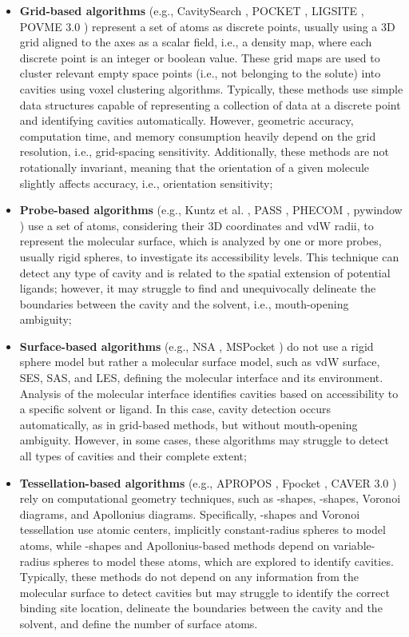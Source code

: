 \documentclass[Ingles]{phdthesis}
\def\ie{i.e.\onedot}
\def\eg{e.g.\onedot}
\begin{document}
\begin{itemize}
  \item \textbf{Grid-based algorithms} (\eg, CavitySearch \cite{cavitysearch}, POCKET \cite{pocket}, LIGSITE \cite{ligsite}, POVME 3.0 \cite{povme}) represent a set of atoms as discrete points, usually using a \acs{3D} grid aligned to the axes as a scalar field, \ie, a density map, where each discrete point is an integer or boolean value. These grid maps are used to cluster relevant empty space points (\ie, not belonging to the solute) into cavities using voxel clustering algorithms. Typically, these methods use simple data structures capable of representing a collection of data at a discrete point and identifying cavities automatically. However, geometric accuracy, computation time, and memory consumption heavily depend on the grid resolution, \ie, grid-spacing sensitivity. Additionally, these methods are not rotationally invariant, meaning that the orientation of a given molecule slightly affects accuracy, \ie, orientation sensitivity;
  \item \textbf{Probe-based algorithms} (\eg, Kuntz et al. \cite{kuntz1982}, PASS \cite{pass}, PHECOM \cite{phecom}, pywindow \cite{pywindow}) use a set of atoms, considering their \acs{3D} coordinates and \ac{vdW} radii, to represent the molecular surface, which is analyzed by one or more probes, usually rigid spheres, to investigate its accessibility levels. This technique can detect any type of cavity and is related to the spatial extension of potential ligands; however, it may struggle to find and unequivocally delineate the boundaries between the cavity and the solvent, \ie, mouth-opening ambiguity;
  \item \textbf{Surface-based algorithms} (\eg, NSA \cite{nsa}, MSPocket \cite{mspocket}) do not use a rigid sphere model but rather a molecular surface model, such as \acs{vdW} surface, \ac{SES}, \ac{SAS}, and \ac{LES}, defining the molecular interface and its environment. Analysis of the molecular interface identifies cavities based on accessibility to a specific solvent or ligand. In this case, cavity detection occurs automatically, as in grid-based methods, but without mouth-opening ambiguity. However, in some cases, these algorithms may struggle to detect all types of cavities and their complete extent;
  \item \textbf{Tessellation-based algorithms} (\eg, APROPOS \cite{apropos}, Fpocket \cite{fpocket}, CAVER 3.0 \cite{caver3}) rely on computational geometry techniques, such as \textalpha-shapes, \textbeta-shapes, Voronoi diagrams, and Apollonius diagrams. Specifically, \textalpha-shapes and Voronoi tessellation use atomic centers, implicitly constant-radius spheres to model atoms, while \textbeta-shapes and Apollonius-based methods depend on variable-radius spheres to model these atoms, which are explored to identify cavities. Typically, these methods do not depend on any information from the molecular surface to detect cavities but may struggle to identify the correct binding site location, delineate the boundaries between the cavity and the solvent, and define the number of surface atoms.
\end{itemize}
\end{document}
